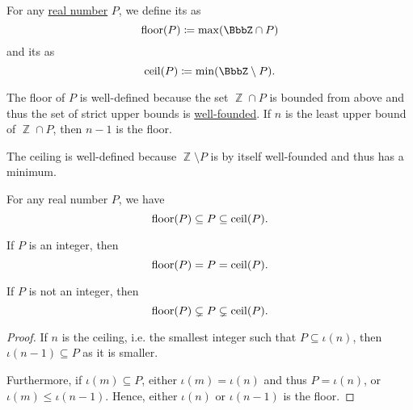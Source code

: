 \begin{definition}\label{def:real_floor_ceiling}
  For any \hyperref[def:real_numbers]{real number} \( P \), we define its  as
  \begin{equation*}
    \floor(P) \coloneqq \max(\BbbZ \cap P)
  \end{equation*}
  and its  as
  \begin{equation*}
    \ceil(P) \coloneqq \min(\BbbZ \setminus P).
  \end{equation*}
\end{definition}
\begin{defproof}
  The floor of \( P \) is well-defined because the set \( \BbbZ \cap P \) is bounded from above and thus the set of strict upper bounds is \hyperref[rem:well_founded_relation]{well-founded}. If \( n \) is the least upper bound of \( \BbbZ \cap P \), then \( n - 1 \) is the floor.

  The ceiling is well-defined because \( \BbbZ \setminus P \) is by itself well-founded and thus has a minimum.
\end{defproof}

\begin{proposition}\label{thm:real_floor_ceiling_interval}
  For any real number \( P \), we have
  \begin{equation*}
    \operatorname{floor}(P) \subseteq P \subseteq \operatorname{ceil}(P).
  \end{equation*}

  \begin{thmenum}
     If \( P \) is an integer, then
    \begin{equation*}
      \operatorname{floor}(P) = P = \operatorname{ceil}(P).
    \end{equation*}

     If \( P \) is not an integer, then
    \begin{equation*}
      \operatorname{floor}(P) \subsetneq P \subsetneq \operatorname{ceil}(P).
    \end{equation*}
  \end{thmenum}
\end{proposition}
\begin{proof}
  If \( n \) is the ceiling, i.e. the smallest integer such that \( P \subseteq \iota(n) \), then \( \iota(n - 1) \subseteq P \) as it is smaller.

  Furthermore, if \( \iota(m) \subseteq P \), either \( \iota(m) = \iota(n) \) and thus \( P = \iota(n) \), or \( \iota(m) \leq \iota(n - 1) \). Hence, either \( \iota(n) \) or \( \iota(n - 1) \) is the floor.
\end{proof}

